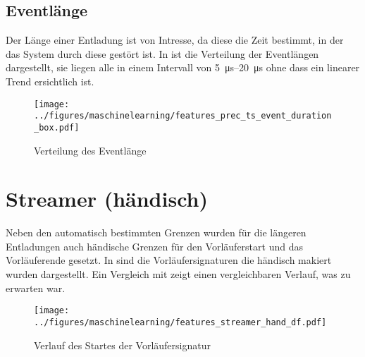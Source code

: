 \subsection{Eventlänge}
Der Länge einer Entladung ist von Intresse, da diese die Zeit bestimmt, in der das System durch diese gestört ist. In  ist die Verteilung der Eventlängen dargestellt, sie liegen alle in einem Intervall von \SIrange{5}{20}{\micro\second} ohne dass ein linearer Trend ersichtlich ist.

\begin{figure}[H]
    \centering
      \texttt{[image: ../figures/maschinelearning/features\_prec\_ts\_event\_duration\_box.pdf]}
      \caption{Verteilung des Eventlänge}
      \label{fig:prec_ts_event_duration_box}
\end{figure}

\begin{table}[h!]
\centering
\caption{Model Performance für die Vorhersage der Eventlänge}
\end{table}




\section{Streamer (händisch)}
Neben den automatisch bestimmten Grenzen wurden für die längeren Entladungen auch händische Grenzen für den Vorläuferstart und das Vorläuferende gesetzt. In  sind die Vorläufersignaturen die händisch makiert wurden dargestellt. Ein Vergleich mit  zeigt einen vergleichbaren Verlauf, was zu erwarten war.

\begin{figure}[H]
    \centering
      \texttt{[image: ../figures/maschinelearning/features\_streamer\_hand\_df.pdf]}
      \caption{Verlauf des Startes der Vorläufersignatur}
      \label{fig:streamer_current_sliece}
\end{figure}

